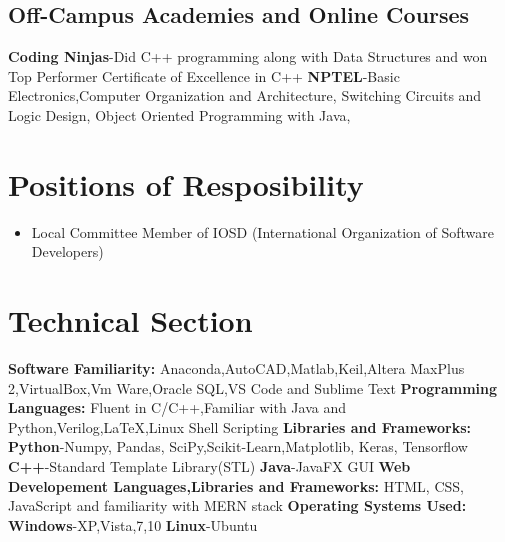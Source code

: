 \documentclass[a4paper,12pt]{article}
\begin{document}
    \subsection*{Off-Campus Academies and Online Courses}
    \textbf{Coding Ninjas}-Did C++ programming along with Data Structures 
    and won Top Performer Certificate of Excellence in C++
    \newline
    \textbf{NPTEL}-Basic Electronics,Computer Organization and Architecture, 
    Switching Circuits and Logic Design, Object Oriented Programming with Java,
    
\section*{Positions of Resposibility}
    \begin{itemize}
        \item Local Committee Member of IOSD
        (International Organization of Software Developers)
    \end{itemize}


\section*{Technical Section}
\textbf{Software Familiarity: }
\newline
Anaconda,AutoCAD,Matlab,Keil,Altera MaxPlus 2,VirtualBox,Vm Ware,Oracle SQL,VS Code and Sublime Text 
\newline
\textbf{Programming Languages: }
\newline
Fluent in C/C++,Familiar with Java and Python,Verilog,LaTeX,Linux Shell Scripting
\newline
\textbf{Libraries and Frameworks: }
\newline
\textbf{Python}-Numpy, Pandas, SciPy,Scikit-Learn,Matplotlib, Keras, Tensorflow    
\newline
\textbf{C++}-Standard Template Library(STL)    
\newline
\textbf{Java}-JavaFX GUI    
\newline
\textbf{Web Developement Languages,Libraries and Frameworks: }
\newline
HTML, CSS, JavaScript and familiarity with MERN stack 
\newline
\textbf{Operating Systems Used: }
\newline
\textbf{Windows}-XP,Vista,7,10
\newline 
\textbf{Linux}-Ubuntu
\end{document}
